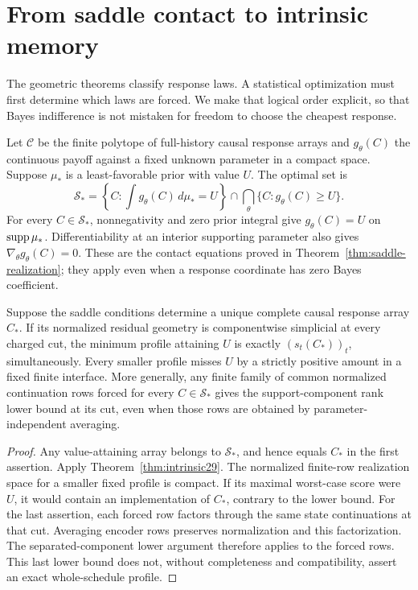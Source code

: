 \section{From saddle contact to intrinsic memory}
\label{sec:contact29}
The geometric theorems classify response laws. A statistical optimization
must first determine which laws are forced. We make that logical order
explicit, so that Bayes indifference is not mistaken for freedom to
choose the cheapest response.

Let $\mathcal C$ be the finite polytope of full-history causal response
arrays and $g_\theta(C)$ the continuous payoff against a fixed unknown
parameter in a compact space. Suppose $\mu_*$ is a least-favorable prior
with value $U$. The optimal set is
\[
 \mathcal S_*=
 \left\{C:\int g_\theta(C)\,d\mu_*=U\right\}
 \cap\bigcap_\theta\{C:g_\theta(C)\ge U\}.
\]
For every $C\in\mathcal S_*$, nonnegativity and zero prior integral give
$g_\theta(C)=U$ on $\operatorname{supp}\mu_*$. Differentiability at an interior
supporting parameter also gives $\nabla_\theta g_\theta(C)=0$.
These are the contact equations proved in
Theorem~\ref{thm:saddle-realization}; they apply even when a response
coordinate has zero Bayes coefficient.

\begin{corollary}
\label{cor:contact-class29}
Suppose the saddle conditions determine a unique complete causal
response array $C_*$. If its normalized residual geometry is
componentwise simplicial at every charged cut, the minimum profile
attaining $U$ is exactly $(s_t(C_*))_t$, simultaneously. Every smaller
profile misses $U$ by a strictly positive amount in a fixed finite
interface. More generally, any finite family of common normalized
continuation rows forced for every $C\in\mathcal S_*$ gives the
support-component rank lower bound at its cut, even when those rows
are obtained by parameter-independent averaging.
\end{corollary}
\begin{proof}
Any value-attaining array belongs to $\mathcal S_*$, and hence equals
$C_*$ in the first assertion. Apply Theorem~\ref{thm:intrinsic29}.
The normalized finite-row realization space for a smaller fixed
profile is compact. If its maximal worst-case score were $U$, it
would contain an implementation of $C_*$, contrary to the lower bound.
For the last assertion, each forced row factors through the same
state continuations at that cut. Averaging encoder rows preserves
normalization and this factorization. The separated-component lower
argument therefore applies to the forced rows. This last lower bound
does not, without completeness and compatibility, assert an exact
whole-schedule profile.
\end{proof}

